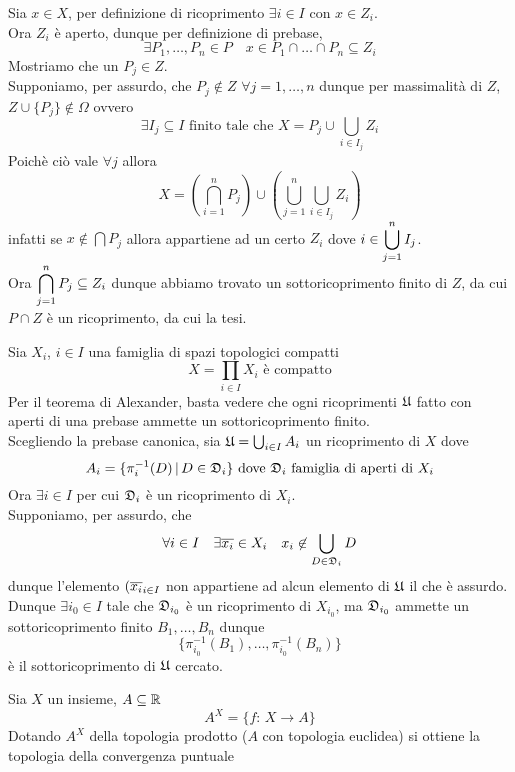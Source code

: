 \begin{thm}[di Alexander]
Sia $x\in X$, per definizione di ricoprimento $\exists i \in I $ con $ x\in Z_i$.\\
Ora $Z_i$ \`e aperto, dunque per definizione di prebase, 
$$ \exists P_1, \dots, P_n \in P \quad x \in P_1 \cap \dots \cap P_n \subseteq Z_i$$
Mostriamo che un $P_j \in Z$.\\
Supponiamo, per assurdo, che $P_j \not \in Z $ $\forall j =1, \dots, n $ dunque per massimalit\`a di $Z$,  $Z\cup \{ P_j\} \not \in \Omega$ ovvero
$$ \exists I_j \subseteq	 I \text{ finito tale che } X = P_j \cup \bigcup_{i\in I_j} Z_i $$
Poich\`e ci\`o vale $\forall j$ allora
$$ X = \left( \bigcap_{i=1}^n P_j \right) \cup \left( \bigcup_{j=1}^n \bigcup_{i \in I_j }Z_i \right)$$ infatti 
se $x \not \in \bigcap P_j$ allora appartiene ad un certo $Z_i$ dove $\displaystyle i \in \bigcup_{j=1}^n I_j$.\\
Ora $\displaystyle \bigcap_{j=1}^n P_j \subseteq Z_i$ dunque abbiamo trovato un sottoricoprimento finito di $Z$, da cui $P\cap Z$ \`e un ricoprimento, da cui la tesi.
\endproof
\end{thm}
\newpage
\begin{thm}[di Tychonoff]\bianco
Sia $X_i$, $i\in I$ una famiglia di spazi topologici compatti
$$ X=\prod_{i \in I } X_i \text{ \`e compatto}$$
\proof Per il teorema di Alexander, basta vedere che ogni  ricoprimenti $\mathfrak{U}$ fatto con aperti di una prebase ammette un sottoricoprimento finito.\\
Scegliendo la prebase canonica, sia $\mathfrak{U}=\bigcup_{i\in I } A_i$ un ricoprimento di $X$ dove 
$$ A_i =\{ \pi_i^{-1}(D)\, \vert \, D\in \mathfrak{D}_i\} \text{ dove } \mathfrak{D}_i \text{ famiglia di aperti di } X_i$$
Ora $\exists i \in I $ per cui $\mathfrak{D}_i$ \`e un  ricoprimento di $X_i$.\\
Supponiamo, per assurdo, che
$$ \forall i \in I \quad \exists \overline{x_i} \in X_i \quad x_i \not \in \bigcup_{D \in \mathfrak{D}_i} D $$
dunque l'elemento $\displaystyle (\overline{x_i}_{i \in I } $  non appartiene ad alcun elemento di $\mathfrak{U}$ il che \`e assurdo.\\
Dunque $\exists i_0 \in I $ tale che $\mathfrak{D}_{i_0}$ \`e un ricoprimento di $X_{i_0}$, ma $\mathfrak{D}_{i_0}$ ammette un sottoricoprimento finito $B_1, \dots, B_n $ dunque 
$$ \{ \pi_{i_0}^{-1}(B_1), \dots , \pi_{i_0}^{-1}(B_n)\}$$
\`e il sottoricoprimento di $\mathfrak{U}$ cercato.\endproof
\end{thm}
\spazio
\begin{ese}Sia $X$ un insieme, $A\subseteq \mathbb{R}$ 
$$ A^X=\{ f :\, X \to A\}$$
Dotando $A^X$ della topologia prodotto ($A$ con topologia euclidea) si ottiene la topologia della convergenza puntuale
\end{ese}
